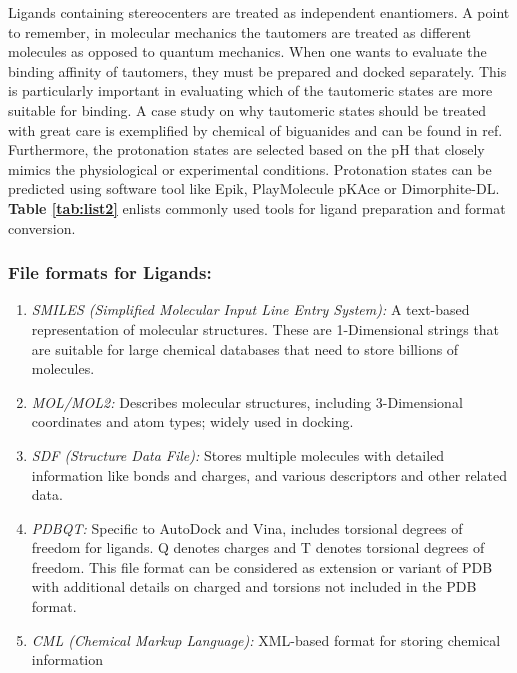 \documentclass[10pt,letterpaper]{article}
\begin{document}
{{Ligands containing stereocenters are treated as independent enantiomers. A point to remember, in molecular mechanics the tautomers are treated as different molecules as opposed to quantum mechanics. When one wants to evaluate the binding affinity of tautomers, they must be prepared and docked separately. This is particularly important in evaluating which of the tautomeric states are more suitable for binding. A case study on why tautomeric states should be treated with great care is exemplified by chemical of biguanides and can be found in ref\cite{bib42}. Furthermore, the protonation states are selected based on the pH that closely mimics the physiological or experimental conditions. Protonation states can be predicted using software tool like Epik\cite{bib45, bib46}, PlayMolecule pKAce\cite{bib43} or Dimorphite-DL\cite{bib44}. \textbf{Table \ref{tab:list2}} enlists commonly used tools for ligand preparation and format conversion. 

\subsubsection*{File formats for Ligands:}
\begin{enumerate}
        \item \textit{SMILES (Simplified Molecular Input Line Entry System):} A text-based representation of molecular structures. These are 1-Dimensional strings that are suitable for large chemical databases that need to store billions of molecules. 
	   \item \textit{MOL/MOL2:} Describes molecular structures, including 3-Dimensional coordinates and atom types; widely used in docking.
	   \item \textit{SDF (Structure Data File):} Stores multiple molecules with detailed information like bonds and charges, and various descriptors and other related data. 
	   \item \textit{PDBQT:} Specific to AutoDock and Vina, includes torsional degrees of freedom for ligands. Q denotes charges and T denotes torsional degrees of freedom. This file format can be considered as extension or variant of PDB with additional details on charged and torsions not included in the PDB format. 
	   \item \textit{CML (Chemical Markup Language):} XML-based format for storing chemical information
\end{enumerate}


}}
\end{document}
